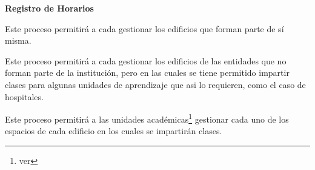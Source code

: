 \begin{PDescripcion}

\Ppaso \textbf{Registro de Horarios}

\begin{enumerate}
	
	\Ppaso[\PSubProceso]  Este proceso permitirá a cada  gestionar los edificios que forman parte de sí misma.

	\Ppaso[\PSubProceso]  Este proceso permitirá a cada  gestionar los edificios de las entidades que no forman parte de la institución, pero en las cuales se tiene permitido impartir clases para algunas unidades de aprendizaje que asi lo requieren, como el caso de hospitales.
		
	\Ppaso[\PSubProceso]  Este proceso permitirá a las unidades académicas\footnote{ver } gestionar cada uno de los espacios de cada edificio en los cuales se impartirán clases.
	
	
\end{enumerate}


%	
%	
%		
%	
%			
\end{PDescripcion}